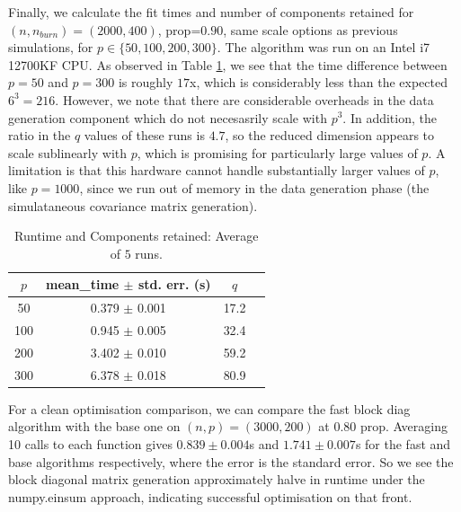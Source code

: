 Finally, we calculate the fit times and number of components retained for $(n,n_{burn})=(2000,400)$, prop=$0.90$, same scale options as previous simulations, for $p\in \{50,100,200,300\}$. The algorithm was run on an Intel i7 12700KF CPU. As observed in Table \ref{tab:label}, we see that the time difference between $p=50$ and $p=300$ is roughly $17$x, which is considerably less than the expected $6^3=216$. However, we note that there are considerable overheads in the data generation component which do not necesasrily scale with $p^3$. In addition, the ratio in the $q$ values of these runs is $4.7$, so the reduced dimension appears to scale sublinearly with $p$, which is promising for particularly large values of $p$. A limitation is that this hardware cannot handle substantially larger values of $p$, like $p=1000$, since we run out of memory in the data generation phase (the simulataneous covariance matrix generation).

\begin{table}[H]
    \centering
    \caption{Runtime and Components retained: Average of $5$ runs.}
    \begin{tabular}{c c c c}
        \toprule
        $p$ & mean\_time $\pm$ std. err. (s) & $q$ \\
        \midrule
        50 & 0.379 $\pm$ 0.001 & 17.2 \\
        \midrule
        100 & 0.945 $\pm$ 0.005 & 32.4 \\
        \midrule
        200 & 3.402 $\pm$ 0.010 & 59.2 \\
        \midrule
        300 & 6.378 $\pm$ 0.018 & 80.9 \\
        \bottomrule
    \end{tabular}
    \label{tab:label}
\end{table}

For a clean optimisation comparison, we can compare the fast block diag algorithm with the base one on $(n,p) = (3000, 200)$ at $0.80$ prop. Averaging 10 calls to each function gives $0.839\pm 0.004$s and $1.741\pm 0.007$s for the fast and base algorithms respectively, where the error is the standard error. So we see the block diagonal matrix generation approximately halve in runtime under the numpy.einsum approach, indicating successful optimisation on that front.